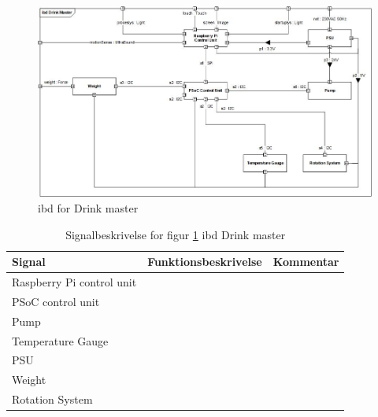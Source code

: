 \begin{figure}[h!]
	\centering
	\includegraphics[width=1\textwidth]{Images/IBD_System_JPEG.jpg}
	\caption{ibd for Drink master}
	\label{fig:ibd}
\end{figure}
\FloatBarrier

\begin{table}[!h] 
	\centering 
	\caption{Signalbeskrivelse for figur \ref{fig:ibd} ibd Drink master}
	\begin{tabular}{|p{3cm}|p{7cm}|p{3cm}|}
		\hline
\textbf{Signal} & \textbf{Funktionsbeskrivelse}  &  \textbf{Kommentar}  \\ \hline
Raspberry Pi control unit   & &  \\ \hline
PSoC control unit    & &  \\ \hline
Pump              & &  \\ \hline
Temperature Gauge & &  \\ \hline
PSU               & &  \\ \hline 
Weight            & &  \\ \hline
Rotation System   & &  \\ \hline

	\end{tabular}
	\label{tab:signalbeskrivelse}
\end{table}
\FloatBarrier